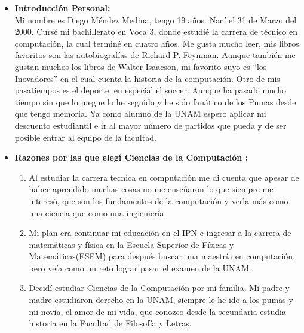 \documentclass{article}
\begin{document}
\begin{itemize}
\item {\bf Introducción Personal:} \\
Mi nombre es Diego Méndez Medina, tengo 19 años. Nací el 31 de Marzo del 2000. Cursé mi bachillerato en Voca 3, donde estudié la carrera de técnico en computación, la cual terminé en cuatro años. Me gusta mucho leer, mis libros favoritos son las autobiografías de Richard P. Feynman. Aunque también me gustan muchos los libros de Walter Isaacson, mi favorito suyo es ``los Inovadores'' en el cual cuenta la historia de la computación. Otro de mis pasatiempos es el deporte, en especial el soccer. Aunque ha pasado mucho tiempo sin que lo juegue lo he seguido y he sido fanático de los Pumas desde que tengo memoria. Ya como alumno de la UNAM espero aplicar mi descuento estudiantil e ir al mayor número de partidos que pueda y de ser posible entrar al equipo de la facultad. \\

\item {\bf Razones por las que elegí Ciencias de la Computación :} \\
  \begin{enumerate}
\item Al estudiar la carrera tecnica en computación me di cuenta que apesar de haber aprendido muchas cosas no me enseñaron lo que siempre me interesó, que son los fundamentos de la computación y verla más como una ciencia que como una ingieniería.

\item Mi plan era continuar mi educación en el IPN e ingresar a la carrera de matemáticas y física en la Escuela Superior de Físicas y Matemáticas(ESFM) para después buscar una maestría en computación, pero veía como un reto lograr pasar el examen de la UNAM.

\item Decidí estudiar Ciencias de la Computación por mi familia. Mi padre y madre estudiaron derecho en la UNAM, siempre le he ido a los pumas y mi novia, el amor de mi vida, que conozco desde la secundaria estudia historia en la Facultad de Filosofía y Letras. \\


\end{enumerate}
\end{itemize}
\end{document}
